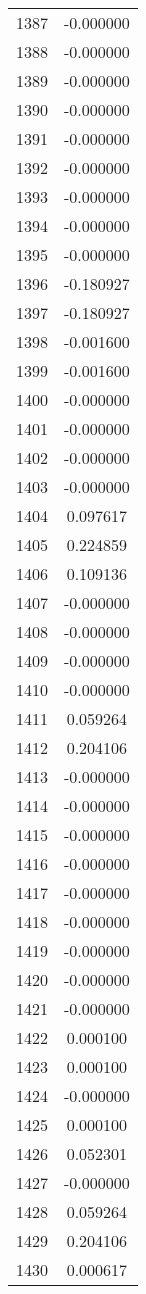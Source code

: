 \documentclass[12pt]{article}
\begin{document}
\begin{longtable}{@{}cc@{}}
1387 & -0.000000 \\
1388 & -0.000000 \\
1389 & -0.000000 \\
1390 & -0.000000 \\
1391 & -0.000000 \\
1392 & -0.000000 \\
1393 & -0.000000 \\
1394 & -0.000000 \\
1395 & -0.000000 \\
1396 & -0.180927 \\
1397 & -0.180927 \\
1398 & -0.001600 \\
1399 & -0.001600 \\
1400 & -0.000000 \\
1401 & -0.000000 \\
1402 & -0.000000 \\
1403 & -0.000000 \\
1404 & 0.097617 \\
1405 & 0.224859 \\
1406 & 0.109136 \\
1407 & -0.000000 \\
1408 & -0.000000 \\
1409 & -0.000000 \\
1410 & -0.000000 \\
1411 & 0.059264 \\
1412 & 0.204106 \\
1413 & -0.000000 \\
1414 & -0.000000 \\
1415 & -0.000000 \\
1416 & -0.000000 \\
1417 & -0.000000 \\
1418 & -0.000000 \\
1419 & -0.000000 \\
1420 & -0.000000 \\
1421 & -0.000000 \\
1422 & 0.000100 \\
1423 & 0.000100 \\
1424 & -0.000000 \\
1425 & 0.000100 \\
1426 & 0.052301 \\
1427 & -0.000000 \\
1428 & 0.059264 \\
1429 & 0.204106 \\
1430 & 0.000617 \\

\end{longtable}
\end{document}
